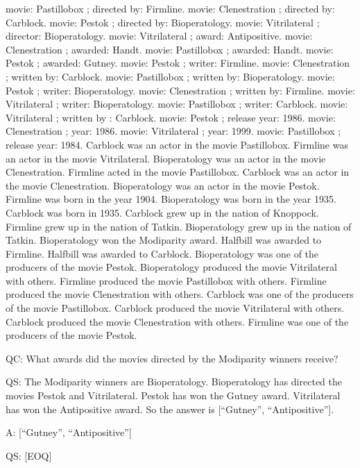 \documentclass[
]{article}
\begin{document}
movie: Pastillobox ; directed by: Firmline. movie: Clenestration ;
directed by: Carblock. movie: Pestok ; directed by: Bioperatology.
movie: Vitrilateral ; director: Bioperatology. movie: Vitrilateral ;
award: Antipositive. movie: Clenestration ; awarded: Handt. movie:
Pastillobox ; awarded: Handt. movie: Pestok ; awarded: Gutney. movie:
Pestok ; writer: Firmline. movie: Clenestration ; written by: Carblock.
movie: Pastillobox ; written by: Bioperatology. movie: Pestok ; writer:
Bioperatology. movie: Clenestration ; written by: Firmline. movie:
Vitrilateral ; writer: Bioperatology. movie: Pastillobox ; writer:
Carblock. movie: Vitrilateral ; written by : Carblock. movie: Pestok ;
release year: 1986. movie: Clenestration ; year: 1986. movie:
Vitrilateral ; year: 1999. movie: Pastillobox ; release year: 1984.
Carblock was an actor in the movie Pastillobox. Firmline was an actor in
the movie Vitrilateral. Bioperatology was an actor in the movie
Clenestration. Firmline acted in the movie Pastillobox. Carblock was an
actor in the movie Clenestration. Bioperatology was an actor in the
movie Pestok. Firmline was born in the year 1904. Bioperatology was born
in the year 1935. Carblock was born in 1935. Carblock grew up in the
nation of Knoppock. Firmline grew up in the nation of Tatkin.
Bioperatology grew up in the nation of Tatkin. Bioperatology won the
Modiparity award. Halfbill was awarded to Firmline. Halfbill was awarded
to Carblock. Bioperatology was one of the producers of the movie Pestok.
Bioperatology produced the movie Vitrilateral with others. Firmline
produced the movie Pastillobox with others. Firmline produced the movie
Clenestration with others. Carblock was one of the producers of the
movie Pastillobox. Carblock produced the movie Vitrilateral with others.
Carblock produced the movie Clenestration with others. Firmline was one
of the producers of the movie Pestok.

QC: What awards did the movies directed by the Modiparity winners
receive?

QS: The Modiparity winners are Bioperatology. Bioperatology has directed
the movies Pestok and Vitrilateral. Pestok has won the Gutney award.
Vitrilateral has won the Antipositive award. So the answer is
{[}``Gutney'', ``Antipositive''{]}.

A: {[}``Gutney'', ``Antipositive''{]}

QS: {[}EOQ{]}
\end{document}
